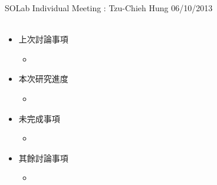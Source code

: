 \documentclass[12pt,a4paper]{article}
\newcommand{\bitem} {\begin{itemize}}
\newcommand{\eitem} {\end{itemize}}
\begin{document}
\begin{CJK}{UTF8}{bkai}
\begin{center}
{\Large {\sc SOLab Individual Meeting : Tzu-Chieh Hung 06/10/2013}}\\~\\
\end{center}

\bitem
\item 上次討論事項
	\bitem
	\item 
	\eitem

\item 本次研究進度
	\bitem
	\item 
	\eitem
\item 未完成事項
	\bitem
	\item 
	\eitem


\item 其餘討論事項
	\bitem
	\item 
	\eitem

\eitem

\end{CJK}
\end{document}
